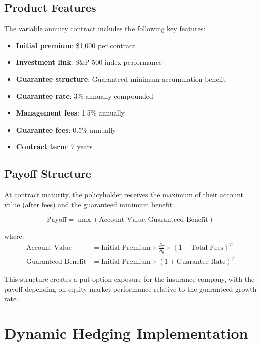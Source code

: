 \documentclass[12pt,a4paper]{report}
\begin{document}
\subsection{Product Features}

The variable annuity contract includes the following key features:

\begin{itemize}
\item \textbf{Initial premium}: \$1,000 per contract
\item \textbf{Investment link}: S\&P 500 index performance
\item \textbf{Guarantee structure}: Guaranteed minimum accumulation benefit
\item \textbf{Guarantee rate}: 3\% annually compounded
\item \textbf{Management fees}: 1.5\% annually
\item \textbf{Guarantee fees}: 0.5\% annually  
\item \textbf{Contract term}: 7 years
\end{itemize}

\subsection{Payoff Structure}

At contract maturity, the policyholder receives the maximum of their account value (after fees) and the guaranteed minimum benefit:

\begin{equation}
\text{Payoff} = \max(\text{Account Value}, \text{Guaranteed Benefit})
\end{equation}

where:
\begin{align}
\text{Account Value} &= \text{Initial Premium} \times \frac{S_T}{S_0} \times (1-\text{Total Fees})^T \\
\text{Guaranteed Benefit} &= \text{Initial Premium} \times (1 + \text{Guarantee Rate})^T
\end{align}

This structure creates a put option exposure for the insurance company, with the payoff depending on equity market performance relative to the guaranteed growth rate.

\section{Dynamic Hedging Implementation}
\end{document}
